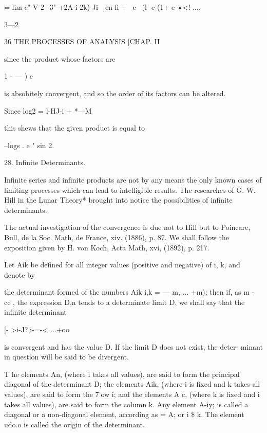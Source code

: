 = lim e"-V 2+3"-+2A-i 2k) Ji\  \ en fi +  \ e~   (l- e  (1+  e •<!-..., 



3—2 



36 THE PROCESSES OF ANALYSIS [CHAP. II 

since the product whose factors are 



1 - — ) e  



is absohitely convergent, and so the order of its factors can be altered. 

Since log2 = l-HJ-i + *---M 

this shews that the given product is equal to 



--logs . 
e " sin 2. 



28. Infinite Determinants. 

Infinite series and infinite products are not by any means the only 
known cases of limiting processes which can lead to intelligible results. The 
researches of G. W. Hill in the Lunar Theory* brought into notice the 
possibilities of infinite determinants. 

The actual investigation of the convergence is due not to Hill but to Poincare, Bull, de 
la Soc. Math, de France, xiv. (1886), p. 87. We shall follow the exposition given by 
H. von Koch, Acta Math, xvi, (1892), p. 217. 

Let Aik be defined for all integer values (positive and negative) of i, k, 
and denote by 

the determinant formed of the numbers Aik i,k = — m, ... +m); then if, 
as m -  cc , the expression D,n tends to a determinate limit D, we shall say 
that the infinite determinant 

[-  >i-J?,i-=-< ...+oo 

is convergent and has the value D. If the limit D does not exist, the deter- 
minant in question will be said to be divergent. 

T he elements An, (where i takes all values), are said to form the principal 
diagonal of the determinant D; the elements Aik, (where i is fixed and k 
takes all values), are said to form the 7'ow i; and the elements A c, (where k 
is fixed and i takes all values), are said to form the column k. Any element 
A-iy; is called a diagonal or a non-diagonal element, according as   = A; or i \$ k. 
The element udo.o is called the origin of the determinant. 

